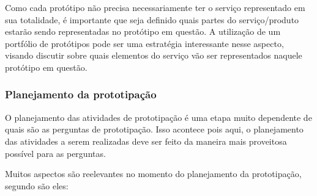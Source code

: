 Como cada protótipo não precisa necessariamente ter o serviço representado em sua totalidade, é importante que seja definido quais partes do serviço/produto estarão sendo representadas no protótipo em questão. A utilização de um portfólio de protótipos pode ser uma estratégia interessante nesse aspecto, visando discutir sobre quais elementos do serviço vão ser representados naquele protótipo em questão.

\subsubsection{Planejamento da prototipação}

O planejamento das atividades de prototipação é uma etapa muito dependente de quais são as perguntas de prototipação. Isso acontece pois aqui, o planejamento das atividades a serem realizadas deve ser feito da maneira mais proveitosa possível para as perguntas.

Muitos aspectos são reelevantes no momento do planejamento da prototipação, segundo \cite{Stickdorn2019} são eles: 

